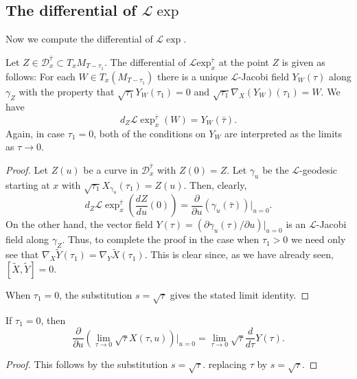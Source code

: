 \subsection{The differential of ${\mathcal L}\exp$}
Now we compute the differential of ${\mathcal L}\exp$.


\begin{lemma}\label{lem:l-exponential-differential}
\label{DLJacobi}
Let $Z\in {\mathcal D}_x^{\bar\tau}\subset T_xM_{T-\tau_1}$. The
differential of ${\mathcal L}\mathrm{exp}^{\bar\tau}_x$
at the point $Z$ is given as follows: For each $W\in
T_x(M_{T-\tau_1})$ there is a unique ${\mathcal L}$-Jacobi
field $Y_W(\tau)$ along
$\gamma_Z$ with the property that $\sqrt{\tau_1}Y_W(\tau_1)=0$ and
$\sqrt{\tau_1}\nabla_X(Y_W)(\tau_1)=W$. We have
$$d_Z{\mathcal L}\exp^{\bar\tau}_x(W)=Y_W(\bar\tau).$$
Again, in case $\tau_1=0$, both of the conditions on $Y_W$ are interpreted as
the limits as $\tau\rightarrow 0$.
\end{lemma}


\begin{proof}
\sketch
{}
Let $Z(u)$ be a curve in ${\mathcal D}_x^{\bar\tau}$ with $Z(0)=Z$.
Let $\gamma_u$ be the ${\mathcal L}$-geodesic starting at $x$ with
$\sqrt{\tau_1}X_{\gamma_u}(\tau_1)=Z(u)$. Then, clearly,
$$d_Z{\mathcal L}\exp^{\bar\tau}_x\left(\frac{dZ}{du}(0)\right)
=\frac{\partial}{\partial u}\left(\gamma_u(\bar\tau)\right)|_{u=0}.$$ On the
other hand, the vector field $Y(\tau)=\left(\partial\gamma_u(\tau)/\partial
u\right)|_{u=0} $ is an ${\mathcal L}$-Jacobi field along $\gamma_Z$.  Thus, to
complete the proof in the case when $\tau_1>0$ we need only see that
$\nabla_X\widetilde Y(\tau_1)=\nabla_Y\widetilde X(\tau_1)$. This is clear
since, as we have already seen, $[\widetilde X,\widetilde Y]=0$.

  When $\tau_1=0$, the substitution $s=\sqrt\tau$ gives the stated
limit identity.
\end{proof}

\begin{claim}\label{claim:l-exp-tau-derivative-limit}
If $\tau_1=0$, then
$$\frac{\partial}{\partial u}\left(\lim_{\tau\rightarrow 0}\sqrt{\tau}X(\tau,u)\right)|_{u=0}=
\lim_{\tau\rightarrow 0}\sqrt{\tau}\frac{d}{d\tau}Y(\tau).$$
\end{claim}

\begin{proof}
\sketch This follows by the substitution $s=\sqrt{\tau}$.
replacing $\tau$ by $s=\sqrt{\tau}$.
\end{proof}

